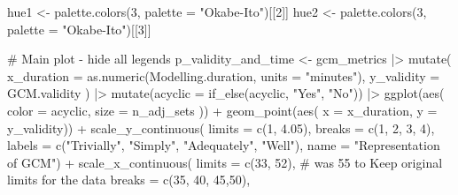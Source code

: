 \documentclass[
  letterpaper,
  DIV=11,
  numbers=noendperiod]{scrartcl}
\newenvironment{Shaded}{\begin{snugshade}}{\end{snugshade}}
\newcommand{\AttributeTok}[1]{\textcolor[rgb]{0.40,0.45,0.13}{#1}}
\newcommand{\CommentTok}[1]{\textcolor[rgb]{0.37,0.37,0.37}{#1}}
\newcommand{\DecValTok}[1]{\textcolor[rgb]{0.68,0.00,0.00}{#1}}
\newcommand{\FloatTok}[1]{\textcolor[rgb]{0.68,0.00,0.00}{#1}}
\newcommand{\FunctionTok}[1]{\textcolor[rgb]{0.28,0.35,0.67}{#1}}
\newcommand{\NormalTok}[1]{\textcolor[rgb]{0.00,0.23,0.31}{#1}}
\newcommand{\OtherTok}[1]{\textcolor[rgb]{0.00,0.23,0.31}{#1}}
\newcommand{\SpecialCharTok}[1]{\textcolor[rgb]{0.37,0.37,0.37}{#1}}
\newcommand{\StringTok}[1]{\textcolor[rgb]{0.13,0.47,0.30}{#1}}
\begin{document}
\begin{Shaded}
\begin{Highlighting}[]
\NormalTok{hue1 }\OtherTok{\textless{}{-}} \FunctionTok{palette.colors}\NormalTok{(}\DecValTok{3}\NormalTok{, }\AttributeTok{palette =} \StringTok{"Okabe{-}Ito"}\NormalTok{)[[}\DecValTok{2}\NormalTok{]]}
\NormalTok{hue2 }\OtherTok{\textless{}{-}} \FunctionTok{palette.colors}\NormalTok{(}\DecValTok{3}\NormalTok{, }\AttributeTok{palette =} \StringTok{"Okabe{-}Ito"}\NormalTok{)[[}\DecValTok{3}\NormalTok{]]}

\CommentTok{\# Main plot {-} hide all legends}
\NormalTok{p\_validity\_and\_time }\OtherTok{\textless{}{-}}\NormalTok{ gcm\_metrics }\SpecialCharTok{|\textgreater{}} 
    \FunctionTok{mutate}\NormalTok{(}
        \AttributeTok{x\_duration =} \FunctionTok{as.numeric}\NormalTok{(Modelling.duration, }\AttributeTok{units =} \StringTok{"minutes"}\NormalTok{),}
        \AttributeTok{y\_validity =}\NormalTok{ GCM.validity}
\NormalTok{    ) }\SpecialCharTok{|\textgreater{}} 
    \FunctionTok{mutate}\NormalTok{(}\AttributeTok{acyclic =} \FunctionTok{if\_else}\NormalTok{(acyclic, }\StringTok{"Yes"}\NormalTok{, }\StringTok{"No"}\NormalTok{)) }\SpecialCharTok{|\textgreater{}} 
    \FunctionTok{ggplot}\NormalTok{(}\FunctionTok{aes}\NormalTok{(}
        \AttributeTok{color =}\NormalTok{ acyclic,}
        \AttributeTok{size =}\NormalTok{ n\_adj\_sets}
\NormalTok{    )) }\SpecialCharTok{+}
    \FunctionTok{geom\_point}\NormalTok{(}\FunctionTok{aes}\NormalTok{(}
        \AttributeTok{x =}\NormalTok{ x\_duration,}
        \AttributeTok{y =}\NormalTok{ y\_validity)) }\SpecialCharTok{+}
    \FunctionTok{scale\_y\_continuous}\NormalTok{(}
        \AttributeTok{limits =} \FunctionTok{c}\NormalTok{(}\DecValTok{1}\NormalTok{, }\FloatTok{4.05}\NormalTok{),}
        \AttributeTok{breaks =} \FunctionTok{c}\NormalTok{(}\DecValTok{1}\NormalTok{, }\DecValTok{2}\NormalTok{, }\DecValTok{3}\NormalTok{, }\DecValTok{4}\NormalTok{),}
        \AttributeTok{labels =} \FunctionTok{c}\NormalTok{(}\StringTok{"Trivially"}\NormalTok{, }\StringTok{"Simply"}\NormalTok{, }\StringTok{"Adequately"}\NormalTok{, }\StringTok{"Well"}\NormalTok{),}
        \AttributeTok{name =} \StringTok{"Representation of GCM"}\NormalTok{) }\SpecialCharTok{+}
    \FunctionTok{scale\_x\_continuous}\NormalTok{(}
        \AttributeTok{limits =} \FunctionTok{c}\NormalTok{(}\DecValTok{33}\NormalTok{, }\DecValTok{52}\NormalTok{),  }\CommentTok{\# was 55 to  Keep original limits for the data}
        \AttributeTok{breaks =} \FunctionTok{c}\NormalTok{(}\DecValTok{35}\NormalTok{, }\DecValTok{40}\NormalTok{, }\DecValTok{45}\NormalTok{,}\DecValTok{50}\NormalTok{),}

\end{Highlighting}
\end{Shaded}
\end{document}
